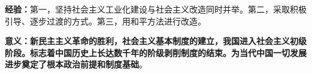 \textbf{{经验}：}{第一，坚持社会主义工业化建设与社会主义改造同时并举。第二，采取积极引导、逐步过渡的方式。第三，用和平方法进行改造。}

\textbf{{意义}：{新民主主义革命的胜利，社会主义基本制度的建立，我国进入社会主义初级阶段。标志着中国历史上长达数千年的阶级剥削制度的结束。为当代中国一切发展进步奠定了根本政治前提和制度基础}}{。}
